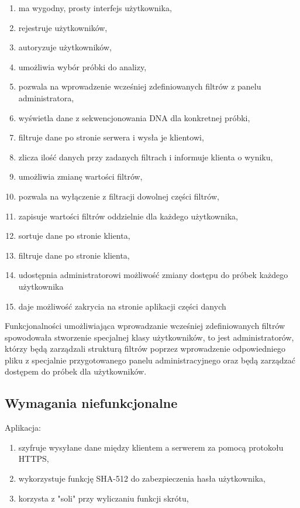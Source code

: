 \documentclass[a4paper,12pt,twoside]{article}
\begin{document}
 \begin{enumerate}[1)]
 \item ma wygodny, prosty interfejs użytkownika,
 \item rejestruje użytkowników,
 \item autoryzuje użytkowników,
 \item umożliwia wybór próbki do analizy,
 \item pozwala na wprowadzenie wcześniej zdefiniowanych filtrów z panelu administratora,
 \item wyświetla dane z sekwencjonowania DNA dla konkretnej próbki,
 \item filtruje dane po stronie serwera i wysła je klientowi,
 \item zlicza ilość danych przy zadanych filtrach i informuje klienta o wyniku,
 \item umożliwia zmianę wartości filtrów,
 \item pozwala na wyłączenie z filtracji dowolnej części filtrów,
 \item zapisuje wartości filtrów oddzielnie dla każdego użytkownika,
 \item sortuje dane po stronie klienta,
 \item filtruje dane po stronie klienta,
 \item udostępnia administratorowi możliwość zmiany dostępu do próbek 
 każdego użytkownika
 \item daje możliwość zakrycia na stronie aplikacji części danych	
 \end{enumerate}
 
Funkcjonalności umożliwiająca wprowadzanie wcześniej zdefiniowanych filtrów spowodowała stworzenie
specjalnej klasy użytkowników, to jest administratorów, którzy będą zarządzali strukturą filtrów poprzez wprowadzenie odpowiedniego pliku z specjalnie przygotowanego panelu administracyjnego
oraz będą zarządzać dostępem do próbek dla użytkowników.

\subsection{Wymagania niefunkcjonalne}
Aplikacja:
 \begin{enumerate}[1)]
  \item szyfruje wysyłane dane między klientem a serwerem za pomocą protokołu HTTPS,
  \item wykorzystuje funkcję SHA-512 do zabezpieczenia hasła użytkownika,
  \item korzysta z "soli" przy wyliczaniu funkcji skrótu,
 \end{enumerate}
\end{document}
